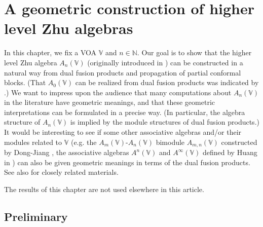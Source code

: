\documentclass[11pt,b5paper,notitlepage]{article}
\theoremstyle{definition}
\theoremstyle{plain}
\newcommand{\Vbb}{\mathbb V}
\newcommand{\Nbb}{\mathbb N}
\newcommand{\<}{\left\langle}
\renewcommand{\>}{\right\rangle}
\numberwithin{equation}{section}
\begin{document}
\section{A geometric construction of higher level Zhu algebras}\label{lb87}


In this chapter, we fix a VOA $\Vbb$ and $n\in \Nbb$.  Our goal is to show that the higher level Zhu algebra $A_n(\Vbb)$ (originally introduced in \cite{Zhu-modular-invariance,DLM-Zhu}) can be constructed in a natural way from dual fusion products and propagation of partial conformal blocks. (That $A_0(\Vbb)$ can be realized from dual fusion products was indicated by \cite[Prop. 7.2.2 and A.2.7]{NT-P1_conformal_blocks}.) We want to impress upon the audience that many computations about $A_n(\Vbb)$ in the literature have geometric meanings, and that these geometric interpretations can be formulated in a precise way. (In particular, the algebra structure of $A_n(\Vbb)$ is implied by the module structures of dual fusion products.) It would be interesting to see if some other associative algebras and/or their modules related to $\Vbb$ (e.g. the $A_m(\Vbb)$-$A_n(\Vbb)$ bimodule $A_{m,n}(\Vbb)$ constructed by Dong-Jiang \cite{DJ-bimodules}, the associative algebras $A^n(\Vbb)$ and $A^\infty(\Vbb)$ defined by Huang in \cite{Hua-associative}) can also be given geometric meanings in terms of the dual fusion products. See also \cite{Li-regular-Zhu,Li-regular-AnV,Li-regular-bimodules} for closely related materials.


The results of this chapter are not used elsewhere in this article.


\subsection{Preliminary}
\end{document}
